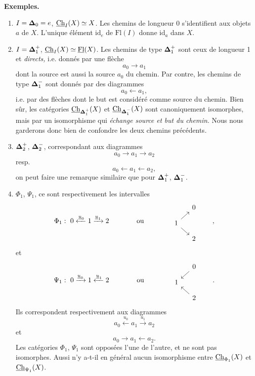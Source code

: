 \textbf{Exemples.}

\begin{enumerate}
\item[1.] $I = \boldsymbol{\Delta}_0 = e$, $\underline{\mathrm{Ch}}_I(X) \simeq X$. Les chemins de longueur 0 s'identifient aux objets $a$ de $X$. L'unique élément $\mathrm{id}_e$ de $\mathrm{Fl}(I)$ donne $\mathrm{id}_a$ dans $X$.

\item[2.] $I = \boldsymbol{\Delta}_1^+$, $\underline{\mathrm{Ch}}_I(X) \simeq \underline{\mathrm{Fl}}(X)$. Les chemins de type $\boldsymbol{\Delta}_1^+$ sont ceux de longueur 1 et \textit{directs,} i.e. donnés par une flèche
\[
a_0 \longrightarrow a_1
\]
dont la source est aussi la source $a_0$ du chemin. Par contre, les chemins de type $\boldsymbol{\Delta}_1^-$ sont donnés par des diagrammes
\[
a_0 \longleftarrow a_1,
\]
i.e. par des flèches dont le but est considéré comme source du chemin. Bien sûr, les catégories $\underline{\mathrm{Ch}}_{\boldsymbol{\Delta}_1^+}(X)$ et $\underline{\mathrm{Ch}}_{\boldsymbol{\Delta}_1^-}(X)$ sont canoniquement isomorphes, mais par un isomorphisme qui \textit{échange source et but du chemin.} Nous nous garderons donc bien de confondre les deux chemins précédents.


\item[3.] $\boldsymbol{\Delta}_2^+$, $\boldsymbol{\Delta}_2^-$, correspondant aux diagrammes
\[
a_0 \longrightarrow a_1 \longrightarrow a_2
\]
resp.
\[
a_0 \longleftarrow a_1 \longleftarrow a_2,
\]
on peut faire une remarque similaire que pour $\boldsymbol{\Delta}_1^+$, $\boldsymbol{\Delta}_1^-$.


\item[4.] $\Phi_1$, $\Psi_1$, ce sont respectivement les intervalles
\[
\Phi_1 :\ 0 \xleftarrow{\underline{u}_0} 1 \xrightarrow{\underline{u}_1} 2 \qquad\qquad \text{ou} \qquad\qquad
\begin{tikzcd}[row sep=small, column sep=small]
 & 0 \\
1 \arrow[ur] \arrow[dr] & \\
 & 2
\end{tikzcd}
\qquad , %
\]
et
\[
\Psi_1 :\ 0 \xrightarrow{\underline{u}_0} 1 \xleftarrow{\underline{u}_1} 2 \qquad\qquad \text{ou} \qquad\qquad
\begin{tikzcd}[row sep=small, column sep=small]
 & 0 \arrow[dl] \\
1 & \\
 & 2 \arrow[ul]
\end{tikzcd}
\qquad .
\]
Ils correspondent respectivement aux diagrammes
\[
a_0 \xleftarrow{u_0} a_1 \xrightarrow{u_1} a_2
\]
et
\[
a_0 \longrightarrow a_1 \longleftarrow a_2.
\]
Les catégories $\Phi_1$, $\Psi_1$ sont opposées l'une de l'autre, et ne sont pas isomorphes. Aussi n'y a-t-il en général aucun isomorphisme entre $\underline{\mathrm{Ch}}_{\Phi_1}(X)$ et $\underline{\mathrm{Ch}}_{\Psi_1}(X)$.
\end{enumerate}

